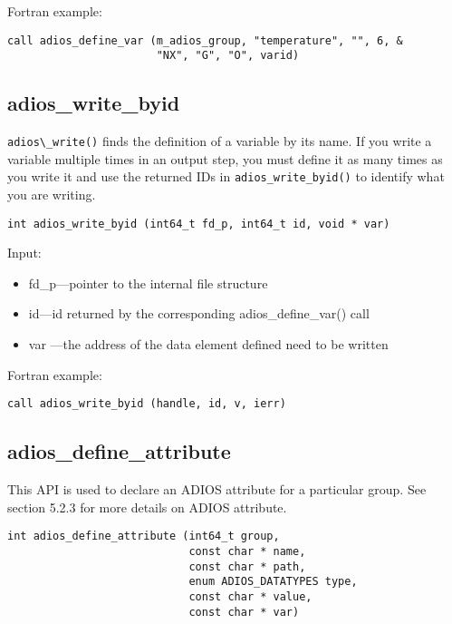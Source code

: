 Fortran example: 
\begin{lstlisting}[alsolanguage=Fortran,caption={},label={}]
call adios_define_var (m_adios_group, "temperature", "", 6, &
                       "NX", "G", "O", varid)
\end{lstlisting}

\subsection{adios\_write\_byid}
\verb+adios\_write()+ finds the definition of a variable by its name. If you write
a variable multiple times in an output step, you must define it as many times as you
write it and use the returned IDs in \verb+adios_write_byid()+ to identify what you
are writing.

\begin{lstlisting}[alsolanguage=C,caption={},label={}]
int adios_write_byid (int64_t fd_p, int64_t id, void * var)
\end{lstlisting}

Input:
\begin{itemize}
\item fd\_p---pointer to the internal file structure
\item id---id returned by the corresponding adios\_define\_var() call
\item var ---the address of the data element defined need to be written
\end{itemize}

Fortran example: 
\begin{lstlisting}[alsolanguage=Fortran,caption={},label={}]
call adios_write_byid (handle, id, v, ierr)
\end{lstlisting}


\subsection{adios\_define\_attribute}

This API is used to declare an ADIOS attribute for a particular group. See section 
5.2.3 for more details on ADIOS attribute.

\begin{lstlisting}[alsolanguage=C,caption={},label={}]
int adios_define_attribute (int64_t group,
                            const char * name, 
                            const char * path,
                            enum ADIOS_DATATYPES type,
                            const char * value,
                            const char * var)
\end{lstlisting}

